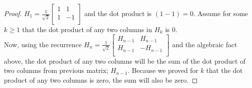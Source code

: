 \documentclass[11pt]{article}
\begin{document}
\begin{proof}
		$H_1 = \frac{1}{\sqrt{2}}\begin{bmatrix}
		1 & 1 \\
		1 & -1 \\
		\end{bmatrix}
		$ and the dot product is $(1-1) = 0$. Assume for some $k \geq 1$ that the dot product of any two columns in $H_k$ is 0. \\
		Now, using the recurrence $H_n = \frac{1}{\sqrt{2}}\begin{bmatrix}
		H_{n-1} & H_{n-1} \\
		H_{n-1} & -H_{n-1} \\
		\end{bmatrix} $ and the algebraic fact above, the dot product of any two columns will be the sum of the dot product of two columns from previous matrix; $H_{n-1}$. Because we proved for $k$ that the dot product of any two columns is zero, the sum will also be zero.
	\end{proof}


	\newpage
	
\end{document}
